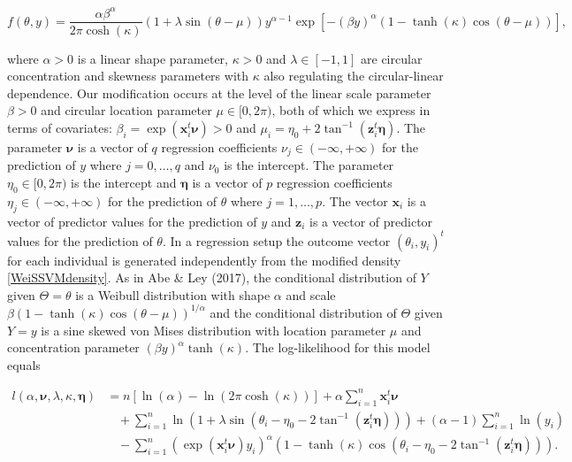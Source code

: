 \documentclass[12pt,]{article}
\begin{document}
\begin{equation}\label{WeiSSVMdensity}
f(\theta, y) = \frac{\alpha\beta^\alpha}{2\pi\cosh(\kappa)}
                 (1 +\lambda\sin(\theta - \mu))
                 y^{\alpha-1}
                 \exp[-(\beta y)^{\alpha}(1-\tanh(\kappa)\cos(\theta - \mu))],
\end{equation}

\noindent where \(\alpha > 0\) is a linear shape parameter,
\(\kappa > 0\) and \(\lambda \in [-1, 1]\) are circular concentration
and skewness parameters with \(\kappa\) also regulating the
circular-linear dependence. Our modification occurs at the level of the
linear scale parameter \(\beta>0\) and circular location parameter
\(\mu\in [0, 2\pi)\), both of which we express in terms of covariates:
\(\beta_i = \exp(\boldsymbol{x}_i^t\boldsymbol{\nu}) > 0\) and
\(\mu_i = \eta_0 + 2\tan^{-1}(\boldsymbol{z}_i^t\boldsymbol{\eta})\).
The parameter \(\boldsymbol{\nu}\) is a vector of \(q\) regression
coefficients \(\nu_j \in (-\infty, +\infty)\) for the prediction of
\(y\) where \(j = 0, \dots, q\) and \(\nu_0\) is the intercept. The
parameter \(\eta_0 \in [0, 2\pi)\) is the intercept and
\(\boldsymbol{\eta}\) is a vector of \(p\) regression coefficients
\(\eta_j \in (-\infty, +\infty)\) for the prediction of \(\theta\) where
\(j = 1, \dots, p\). The vector \(\boldsymbol{x}_i\) is a vector of
predictor values for the prediction of \(y\) and \(\boldsymbol{z}_i\) is
a vector of predictor values for the prediction of \(\theta\). In a
regression setup the outcome vector \((\theta_i, y_i)^t\) for each
individual is generated independently from the modified density
\eqref{WeiSSVMdensity}.\newline
\indent As in Abe \& Ley (2017), the conditional distribution of \(Y\)
given \(\Theta=\theta\) is a Weibull distribution with shape \(\alpha\)
and scale \(\beta(1-\tanh(\kappa)\cos(\theta - \mu))^{1/\alpha}\) and
the conditional distribution of \(\Theta\) given \(Y=y\) is a sine
skewed von Mises distribution with location parameter \(\mu\) and
concentration parameter \((\beta y)^\alpha\tanh(\kappa)\). The
log-likelihood for this model equals

\begin{align}\label{WeiSSVMLikelihood}
l(\alpha, \boldsymbol{\nu}, \lambda, \kappa, \boldsymbol{\eta}) 
   &= n[\ln(\alpha) - \ln(2\pi\cosh(\kappa))] + \alpha \sum^{n}_{i = 1} \boldsymbol{x}_i^t\boldsymbol{\nu} \nonumber\\
   &\:\:\:\:+\sum^{n}_{i = 1} \ln(1 +\lambda\sin(\theta_i - \eta_0 - 2\tan^{-1}(\boldsymbol{z}_i^t\boldsymbol{\eta}))) 
   +(\alpha-1)\sum^{n}_{i = 1} \ln(y_i) \nonumber\\
   &\:\:\:\:-\sum^{n}_{i = 1}( \exp(\boldsymbol{x}_i^t\boldsymbol{\nu})y_i)^{\alpha}(1-\tanh(\kappa)\cos(\theta_i - \eta_0 - 2\tan^{-1}(\boldsymbol{z}_i^t\boldsymbol{\eta}))).\nonumber
\end{align}
\end{document}
